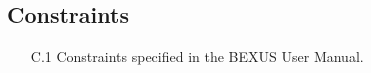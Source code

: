 \newpage
\subsection{Constraints}

\begin{enumerate}
    \item[C.1] Constraints specified in the BEXUS User Manual.
\end{enumerate}